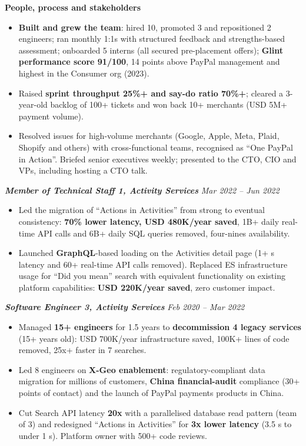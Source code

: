 \documentclass[10pt,a4paper]{article}
\newcommand{\bd}[1]{\textbf{#1}}
\newcommand{\role}[2]{%
  \par\vspace{5pt}\noindent\textcolor{rolecolor}{\textbf{\textit{#1}}}\hfill
  \textcolor{rolecolor}{\textit{#2}}\par\nopagebreak}
\newcommand{\subhead}[1]{%
  \par\vspace{4pt}\noindent\textcolor{rolecolor}{\textbf{#1}}\par\nopagebreak\vspace{0.5pt}}
\begin{document}
\subhead{People, process and stakeholders}
\begin{itemize}
\item \bd{Built and grew the team}: hired 10, promoted 3 and repositioned 2 engineers; ran
  monthly 1:1s with structured feedback and strengths-based assessment; onboarded 5 interns
  (all secured pre-placement offers); \bd{Glint performance score 91/100}, 14 points above
  PayPal management and highest in the Consumer org (2023).
\item Raised \bd{sprint throughput 25\%+ and say-do ratio 70\%+}; cleared a 3-year-old backlog of
  100+ tickets and won back 10+ merchants (USD 5M+ payment volume).
\item Resolved issues for high-volume merchants (Google, Apple, Meta, Plaid, Shopify and others)
  with cross-functional teams, recognised as ``One PayPal in Action''. Briefed senior executives
  weekly; presented to the CTO, CIO and VPs, including hosting a CTO talk.
\end{itemize}

\role{Member of Technical Staff 1, Activity Services}{Mar 2022 -- Jun 2022}
\begin{itemize}
\item Led the migration of ``Actions in Activities'' from strong to eventual consistency:
  \bd{70\% lower latency, USD 480K/year saved}, 1B+ daily real-time API calls and 6B+ daily SQL
  queries removed, four-nines availability.
\item Launched \bd{GraphQL}-based loading on the Activities detail page (1+ s latency and 60+
  real-time API calls removed). Replaced ES infrastructure usage for ``Did you mean'' search with
  equivalent functionality on existing platform capabilities: \bd{USD 220K/year saved}, zero
  customer impact.
\end{itemize}

\role{Software Engineer 3, Activity Services}{Feb 2020 -- Mar 2022}
\begin{itemize}
\item Managed \bd{15+ engineers} for 1.5 years to \bd{decommission 4 legacy services} (15+ years
  old): USD 700K/year infrastructure saved, 100K+ lines of code removed,
  25x+ faster in 7 searches.
\item Led 8 engineers on \bd{X-Geo enablement}: regulatory-compliant data
  migration for millions of customers, \bd{China financial-audit} compliance (30+ points of
  contact) and the launch of PayPal payments products in China.
\item Cut Search API latency \bd{20x} with a parallelised database read pattern (team of 3) and
  redesigned ``Actions in Activities'' for \bd{3x lower latency} (3.5 s to under 1 s). Platform
  owner with 500+ code reviews.
\end{itemize}
\end{document}
